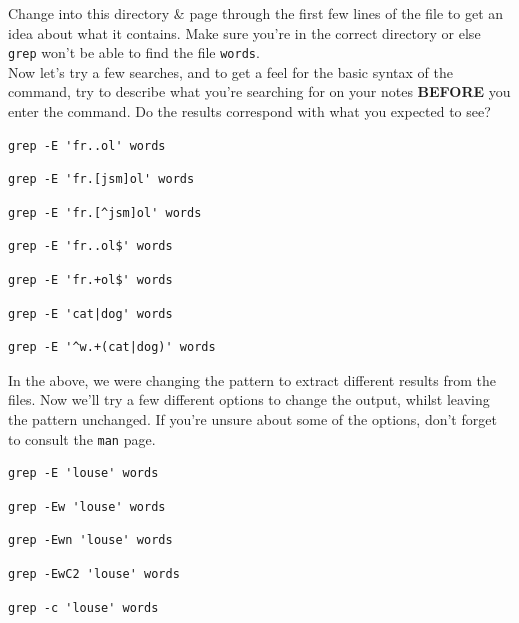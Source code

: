 \documentclass[a4paper,12pt,twoside]{memoir}
\begin{document}
\begin{steps}
Change into this directory \& page through the first few lines of the file to get an idea about what it contains. 
Make sure you're in the correct directory or else \texttt{grep} won't be able to find the file \texttt{words}. \\

Now let's try a few searches, and to get a feel for the basic syntax of the command, try to describe what you're searching for on your notes \textbf{BEFORE} you enter the command.
Do the results correspond with what you expected to see?

\begin{lstlisting}
grep -E 'fr..ol' words
\end{lstlisting}
\begin{lstlisting}
grep -E 'fr.[jsm]ol' words
\end{lstlisting}
\begin{lstlisting}
grep -E 'fr.[^jsm]ol' words
\end{lstlisting}
\begin{lstlisting}
grep -E 'fr..ol$' words
\end{lstlisting}
\begin{lstlisting}
grep -E 'fr.+ol$' words
\end{lstlisting}
\begin{lstlisting}
grep -E 'cat|dog' words
\end{lstlisting}
\begin{lstlisting}
grep -E '^w.+(cat|dog)' words
\end{lstlisting}
\end{steps}

\begin{steps}
In the above, we were changing the pattern to extract different results from the files.
Now we'll try a few different options to change the output, whilst leaving the pattern unchanged.
If you're unsure about some of the options, don't forget to consult the \texttt{man} page. \\
\begin{lstlisting}
grep -E 'louse' words
\end{lstlisting}
\begin{lstlisting}
grep -Ew 'louse' words
\end{lstlisting}
\begin{lstlisting}
grep -Ewn 'louse' words
\end{lstlisting}
\begin{lstlisting}
grep -EwC2 'louse' words
\end{lstlisting}
\begin{lstlisting}
grep -c 'louse' words
\end{lstlisting}
\end{steps}
\end{document}
